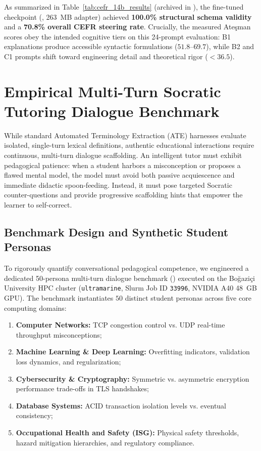 \documentclass[a4paper,12pt]{report}
\begin{document}
As summarized in Table~\ref{tab:cefr_14b_results} (archived in ), the fine-tuned checkpoint (, 263~MB adapter) achieved \textbf{100.0\% structural schema validity} and a \textbf{70.8\% overall CEFR steering rate}. Crucially, the measured Ate\c{s}man scores obey the intended cognitive tiers on this 24-prompt evaluation: B1 explanations produce accessible syntactic formulations ($51.8$--$69.7$), while B2 and C1 prompts shift toward engineering detail and theoretical rigor ($<36.5$).

\section{Empirical Multi-Turn Socratic Tutoring Dialogue Benchmark}
\label{sec:socratic_dialogue_bench}
While standard Automated Terminology Extraction (ATE) harnesses evaluate isolated, single-turn lexical definitions, authentic educational interactions require continuous, multi-turn dialogue scaffolding. An intelligent tutor must exhibit pedagogical patience: when a student harbors a misconception or proposes a flawed mental model, the model must avoid both passive acquiescence and immediate didactic spoon-feeding. Instead, it must pose targeted Socratic counter-questions and provide progressive scaffolding hints that empower the learner to self-correct.

\subsection{Benchmark Design and Synthetic Student Personas}
To rigorously quantify conversational pedagogical competence, we engineered a dedicated 50-persona multi-turn dialogue benchmark () executed on the Bo\u{g}azi\c{c}i University HPC cluster (\texttt{ultramarine}, Slurm Job ID \texttt{33996}, NVIDIA A40 48~GB GPU). The benchmark instantiates $50$ distinct student personas across five core computing domains:
\begin{enumerate}[leftmargin=2.5em]
    \item \textbf{Computer Networks:} TCP congestion control vs. UDP real-time throughput misconceptions;
    \item \textbf{Machine Learning \& Deep Learning:} Overfitting indicators, validation loss dynamics, and regularization;
    \item \textbf{Cybersecurity \& Cryptography:} Symmetric vs. asymmetric encryption performance trade-offs in TLS handshakes;
    \item \textbf{Database Systems:} ACID transaction isolation levels vs. eventual consistency;
    \item \textbf{Occupational Health and Safety (ISG):} Physical safety thresholds, hazard mitigation hierarchies, and regulatory compliance.
\end{enumerate}
\end{document}
